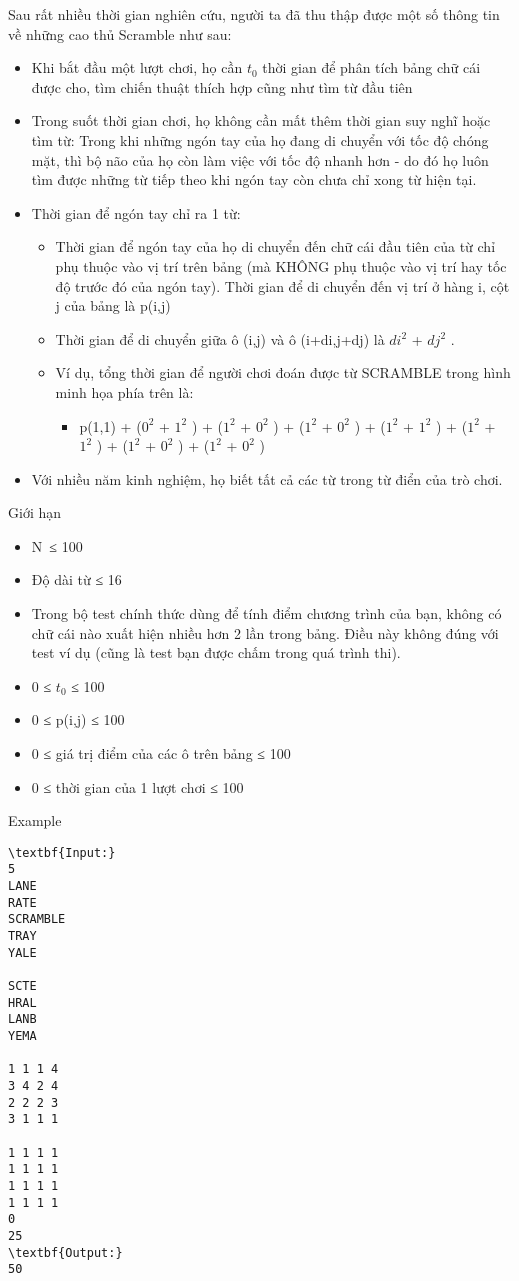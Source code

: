 Sau rất nhiều thời gian nghiên cứu, người ta đã thu thập được một số thông tin về những cao thủ Scramble như sau:
\begin{itemize}
	\item Khi bắt đầu một lượt chơi, họ cần $t_{0}$ thời gian để phân tích bảng chữ cái được cho, tìm chiến thuật thích hợp cũng như tìm từ đầu tiên
	\item Trong suốt thời gian chơi, họ không cần mất thêm thời gian suy nghĩ hoặc tìm từ: Trong khi những ngón tay của họ đang di chuyển với tốc độ chóng mặt, thì bộ não của họ còn làm việc với tốc độ nhanh hơn - do đó họ luôn tìm được những từ tiếp theo khi ngón tay còn chưa chỉ xong từ hiện tại.
	\item Thời gian để ngón tay chỉ ra 1 từ:
\begin{itemize}
	\item Thời gian để ngón tay của họ di chuyển đến chữ cái đầu tiên của từ chỉ phụ thuộc vào vị trí trên bảng (mà KHÔNG phụ thuộc vào vị trí hay tốc độ trước đó của ngón tay). Thời gian để di chuyển đến vị trí ở hàng i, cột j của bảng là p(i,j)
	\item Thời gian để di chuyển giữa ô (i,j) và ô (i+di,j+dj) là $di^{2}$ + $dj^{2}$ .
	\item Ví dụ, tổng thời gian để người chơi đoán được từ SCRAMBLE trong hình minh họa phía trên là:
\begin{itemize}
	\item p(1,1) + ($0^{2}$ + $1^{2}$ ) + ($1^{2}$ + $0^{2}$ ) + ($1^{2}$ + $0^{2}$ ) + ($1^{2}$ + $1^{2}$ ) + ($1^{2}$ + $1^{2}$ ) + ($1^{2}$ + $0^{2}$ ) + ($1^{2}$ + $0^{2}$ )
\end{itemize}
\end{itemize}
	\item Với nhiều năm kinh nghiệm, họ biết tất cả các từ trong từ điển của trò chơi.
\end{itemize}
Giới hạn
\begin{itemize}
	\item N ≤ 100
	\item Độ dài từ ≤ 16
	\item Trong bộ test chính thức dùng để tính điểm chương trình của bạn, không có chữ cái nào xuất hiện nhiều hơn 2 lần trong bảng. Điều này không đúng với test ví dụ (cũng là test bạn được chấm trong quá trình thi).
	\item 0 ≤ $t_{0}$ ≤ 100
	\item 0 ≤ p(i,j) ≤ 100
	\item 0 ≤ giá trị điểm của các ô trên bảng ≤ 100
	\item 0 ≤ thời gian của 1 lượt chơi ≤ 100
\end{itemize}
Example
\begin{verbatim}
\textbf{Input:}
5
LANE
RATE
SCRAMBLE
TRAY
YALE

SCTE
HRAL
LANB
YEMA

1 1 1 4
3 4 2 4
2 2 2 3
3 1 1 1

1 1 1 1
1 1 1 1
1 1 1 1
1 1 1 1
0
25
\textbf{Output:}
50
\end{verbatim}